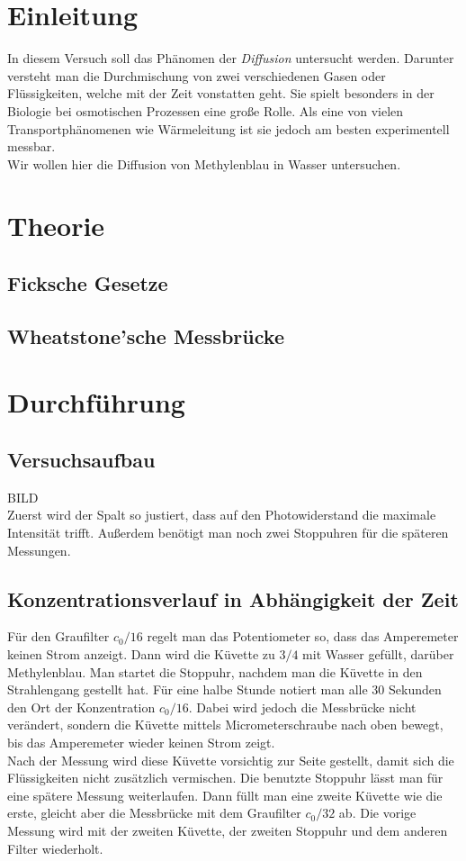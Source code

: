 \documentclass[12pt,a4paper,titlepage,headinclude,bibtotoc]{scrartcl}
\begin{document}
\tableofcontents

\newpage

\section{Einleitung}
\label{sec:einleitung}
In diesem Versuch soll das Phänomen der \textit{Diffusion} untersucht werden.
Darunter versteht man die Durchmischung von zwei verschiedenen Gasen oder Flüssigkeiten, welche mit der Zeit vonstatten geht.
Sie spielt besonders in der Biologie bei osmotischen Prozessen eine große Rolle.
Als eine von vielen Transportphänomenen wie Wärmeleitung ist sie jedoch am besten experimentell messbar.\\
Wir wollen hier die Diffusion von Methylenblau in Wasser untersuchen.

\section{Theorie}
\label{sec:theorie}
\subsection{Ficksche Gesetze}

\subsection{Wheatstone'sche Messbrücke}

\section{Durchführung}
\label{sec:durchfuehrung}
\subsection{Versuchsaufbau}
BILD\\
Zuerst wird der Spalt so justiert, dass auf den Photowiderstand die maximale Intensität trifft.
Außerdem benötigt man noch zwei Stoppuhren für die späteren Messungen.
\subsection{Konzentrationsverlauf in Abhängigkeit der Zeit}
Für den Graufilter $c_0/16$ regelt man das Potentiometer so, dass das Amperemeter keinen Strom anzeigt.
Dann wird die Küvette zu $3/4$ mit Wasser gefüllt, darüber Methylenblau.
Man startet die Stoppuhr, nachdem man die Küvette in den Strahlengang gestellt hat.
Für eine halbe Stunde notiert man alle 30 Sekunden den Ort der Konzentration $c_0/16$.
Dabei wird jedoch die Messbrücke nicht verändert, sondern die Küvette mittels Micrometerschraube nach oben bewegt, bis das Amperemeter wieder keinen Strom zeigt.\\
Nach der Messung wird diese Küvette vorsichtig zur Seite gestellt, damit sich die Flüssigkeiten nicht zusätzlich vermischen.
Die benutzte Stoppuhr lässt man für eine spätere Messung weiterlaufen.
Dann füllt man eine zweite Küvette wie die erste, gleicht aber die Messbrücke mit dem Graufilter $c_0/32$ ab.
Die vorige Messung wird mit der zweiten Küvette, der zweiten Stoppuhr und dem anderen Filter wiederholt.
\end{document}
